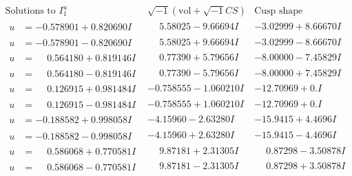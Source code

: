 \documentclass[1p]{elsarticle_modified}
\theoremstyle{definition}
\newcommand{\I}{\sqrt{-1}}
\begin{document}
$$\begin{array}{c|c|c}  
\text{Solutions to }I^u_{1}& \I (\text{vol} + \sqrt{-1}CS) & \text{Cusp shape}\\
 \hline 
\begin{aligned}
u &= -0.578901 + 0.820690 I\end{aligned}
 & \phantom{-}5.58025 - 9.66694 I & -3.02999 + 8.66670 I \\ \hline\begin{aligned}
u &= -0.578901 - 0.820690 I\end{aligned}
 & \phantom{-}5.58025 + 9.66694 I & -3.02999 - 8.66670 I \\ \hline\begin{aligned}
u &= \phantom{-}0.564180 + 0.819146 I\end{aligned}
 & \phantom{-}0.77390 + 5.79656 I & -8.00000 - 7.45829 I \\ \hline\begin{aligned}
u &= \phantom{-}0.564180 - 0.819146 I\end{aligned}
 & \phantom{-}0.77390 - 5.79656 I & -8.00000 + 7.45829 I \\ \hline\begin{aligned}
u &= \phantom{-}0.126915 + 0.981484 I\end{aligned}
 & -0.758555 - 1.060210 I & -12.70969 + 0. I\phantom{ +0.000000I} \\ \hline\begin{aligned}
u &= \phantom{-}0.126915 - 0.981484 I\end{aligned}
 & -0.758555 + 1.060210 I & -12.70969 + 0. I\phantom{ +0.000000I} \\ \hline\begin{aligned}
u &= -0.188582 + 0.998058 I\end{aligned}
 & -4.15960 - 2.63280 I & -15.9415 + 4.4696 I \\ \hline\begin{aligned}
u &= -0.188582 - 0.998058 I\end{aligned}
 & -4.15960 + 2.63280 I & -15.9415 - 4.4696 I \\ \hline\begin{aligned}
u &= \phantom{-}0.586068 + 0.770581 I\end{aligned}
 & \phantom{-}9.87181 + 2.31305 I & \phantom{-}0.87298 - 3.50878 I \\ \hline\begin{aligned}
u &= \phantom{-}0.586068 - 0.770581 I\end{aligned}
 & \phantom{-}9.87181 - 2.31305 I & \phantom{-}0.87298 + 3.50878 I \\ \hline\begin{aligned}

\end{aligned}
\end{array}$$
\end{document}
